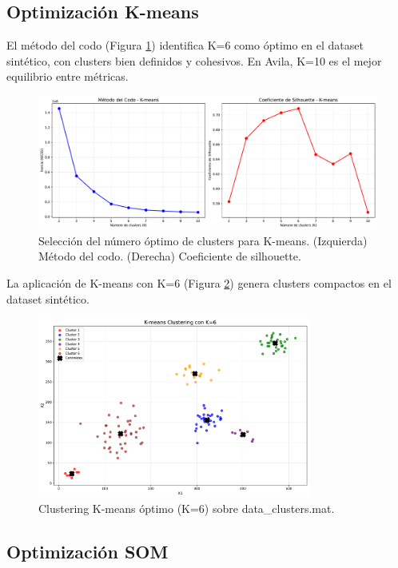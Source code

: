 \documentclass[12pt,a4paper]{article}
\begin{document}
\subsection{Optimización K-means}

El método del codo (Figura \ref{fig:metodo_codo}) identifica K=6 como óptimo en el dataset sintético, con clusters bien definidos y cohesivos. En Avila, K=10 es el mejor equilibrio entre métricas.

\begin{figure}[H]
    \centering
    \includegraphics[width=\textwidth]{figures/figura_02_metodo_codo_kmeans.pdf}
    \caption{Selección del número óptimo de clusters para K-means. (Izquierda) Método del codo. (Derecha) Coeficiente de silhouette.}
    \label{fig:metodo_codo}
\end{figure}

La aplicación de K-means con K=6 (Figura \ref{fig:kmeans_optimo}) genera clusters compactos en el dataset sintético.

\begin{figure}[H]
    \centering
    \includegraphics[width=0.8\textwidth]{figures/figura_03_kmeans_optimo.pdf}
    \caption{Clustering K-means óptimo (K=6) sobre data\_clusters.mat.}
    \label{fig:kmeans_optimo}
\end{figure}

\subsection{Optimización SOM}
\end{document}
